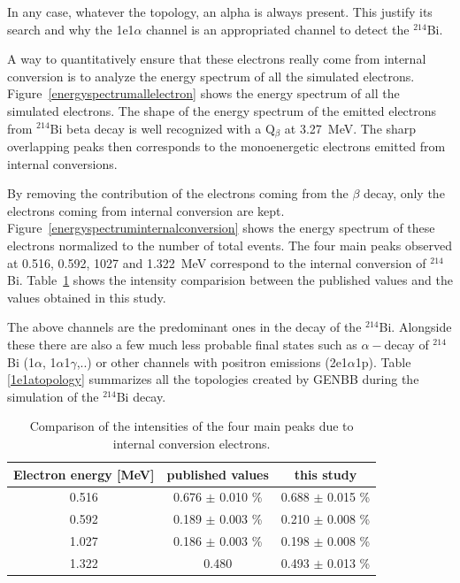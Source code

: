 \documentclass[main.tex]{subfiles}
\begin{document}
\noindent In any case, whatever the topology, an alpha is always present. This justify its search and why the 1e1$\alpha$ channel is an appropriated channel to detect the $^{\text{214}}$Bi.


\bigskip

 
\noindent A way to quantitatively ensure that these electrons really come from internal conversion is to analyze the energy spectrum of all the simulated electrons. Figure~\ref{energyspectrumallelectron} shows the energy spectrum of all the simulated electrons. The shape of the energy spectrum of the emitted electrons from $^{\text{214}}$Bi beta decay is well recognized with a Q$_\beta$ at 3.27~MeV. The sharp overlapping peaks then corresponds to the monoenergetic electrons emitted from internal conversions. 


\bigskip

\noindent By removing the contribution of the electrons coming from the $\beta$ decay, only the electrons coming from internal conversion are kept. Figure~\ref{energyspectruminternalconversion} shows the energy spectrum of these electrons normalized to the number of total events. The four main peaks observed at 0.516, 0.592, 1027 and 1.322~MeV correspond to the internal conversion of $^{\text{214}}$Bi. Table~\ref{internalconversioncomparaison} shows the intensity comparision between the published values \cite{NuclearDataSheet210} and the values obtained in this study. 


\bigskip


\noindent The above channels are the predominant ones in the decay of the $^{\text{214}}$Bi. Alongside these there are also a few much less probable final states such as $\alpha-$decay of $^{\text{214}}$Bi (1$\alpha$, 1$\alpha$1$\gamma$,..) or other channels with positron emissions (2e1$\alpha$1p). Table \ref{1e1atopology} summarizes all the topologies created by GENBB during the simulation of the $^{\text{214}}$Bi decay.


\begin{table}[h!]
\begin{center}
\begin{tabular}{c|c|c}
Electron energy [MeV]  & published values & this study \\[0.1cm]
\toprule
0.516  & 0.676 $\pm$ 0.010 \% & 0.688 $\pm$ 0.015 \% \\[0.1cm]
0.592  & 0.189 $\pm$ 0.003 \% & 0.210 $\pm$ 0.008 \% \\[0.1cm]
1.027  & 0.186 $\pm$ 0.003 \% & 0.198 $\pm$ 0.008 \% \\[0.1cm]            
1.322  & 0.480  & 0.493 $\pm$ 0.013 \% \\[0.1cm]
\bottomrule
\end{tabular}
\end{center}
\caption{Comparison of the intensities of the four main peaks due to internal conversion electrons.}
\label{internalconversioncomparaison}
\end{table}
\end{document}
